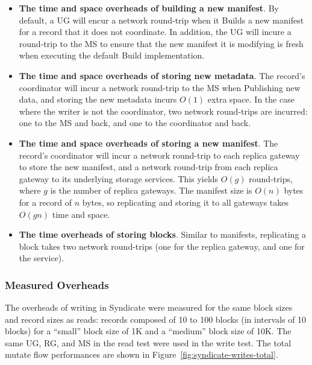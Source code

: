 \begin{itemize}
\item \textbf{The time and space overheads of building a new manifest}.  By
default, a UG will encur a network round-trip when it Builds a new manifest for a record that
it does not coordinate.  In addition, the UG will incure a round-trip to
the MS to ensure that the new manifest it is modifying is fresh when executing
the default Build implementation.
\item \textbf{The time and space overheads of storing new metadata}.  The
record's coordinator will incur a network round-trip to the MS when Publishing
new data, and storing the new metadata incurs $O(1)$ extra space.  In the case
where the writer is not the coordinator, two network round-trips are incurred:
one to the MS and back, and one to the coordinator and back.
\item \textbf{The time and space overheads of storing a new manifest}.  The
record's coordinator will incur a network round-trip to each replica gateway to
store the new manifest, and a network round-trip from each replica gateway to
its underlying storage services.  This yields $O(g)$ round-trips, where $g$ is the number of
replica gateways.  The manifest size is $O(n)$ bytes for a record of $n$ bytes,
so replicating and storing it to all gateways takes $O(gn)$ time and space.
\item \textbf{The time overheads of storing blocks}.  Similar to manifests,
replicating a block takes two network round-trips (one for the replica gateway,
and one for the service).
\end{itemize}

\subsubsection{Measured Overheads}

The overheads of writing in Syndicate were measured for the same block sizes and
record sizes as reads:  records composed of 10 to 100 blocks (in intervals of 10
blocks) for a ``small'' block size of 1K and a ``medium'' block size of 10K.
The same UG, RG, and MS in the read test were used in the write test.
The total mutate flow performances are shown in
Figure~\ref{fig:syndicate-writes-total}.

